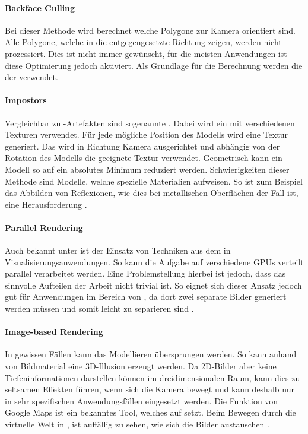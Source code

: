 \paragraph{Backface Culling}
\label{chap:backfaceCulling}
Bei dieser Methode wird berechnet welche Polygone zur Kamera orientiert sind.
Alle Polygone, welche in die entgegengesetzte Richtung zeigen, werden nicht prozessiert.
Dies ist nicht immer gewünscht, für die meisten Anwendungen ist diese Optimierung jedoch aktiviert.
Als Grundlage für die Berechnung werden die  der  verwendet.

\paragraph{Impostors}
Vergleichbar zu -Artefakten sind sogenannte . Dabei wird ein  mit verschiedenen Texturen verwendet. Für jede mögliche Position des Modells wird eine Textur generiert. Das  wird in Richtung Kamera ausgerichtet und abhängig von der Rotation des Modells die geeignete Textur verwendet. Geometrisch kann ein Modell so auf ein absolutes Minimum reduziert werden. Schwierigkeiten dieser Methode sind Modelle, welche spezielle Materialien aufweisen. So ist zum Beispiel das Abbilden von Reflexionen, wie dies bei metallischen Oberflächen der Fall ist, eine Herausforderung \cite{usingImpostors}.

\paragraph{Parallel Rendering}
Auch bekannt unter  ist der Einsatz von Techniken aus dem  in Visualisierungsanwendungen. So kann die Aufgabe auf verschiedene \glspl{GPU} verteilt parallel verarbeitet werden. Eine Problemstellung hierbei ist jedoch, dass das sinnvolle Aufteilen der Arbeit nicht trivial ist. So eignet sich dieser Ansatz jedoch gut für Anwendungen im Bereich von , da dort zwei separate Bilder generiert werden müssen und somit leicht zu separieren sind \cite{parallelRenderingPhd}.

\paragraph{Image-based Rendering}
In gewissen Fällen kann das Modellieren übersprungen werden. So kann anhand von Bildmaterial eine 3D-Illusion erzeugt werden. Da 2D-Bilder aber keine Tiefeninformationen darstellen können im dreidimensionalen Raum, kann dies zu seltsamen Effekten führen, wenn sich die Kamera bewegt und kann deshalb nur in sehr spezifischen Anwendungsfällen eingesetzt werden. Die  Funktion von Google Maps ist ein bekanntes Tool, welches auf  setzt.
Beim Bewegen durch die virtuelle Welt in , ist auffällig zu sehen, wie sich die Bilder austauschen \cite{imageBasedRendering}.

